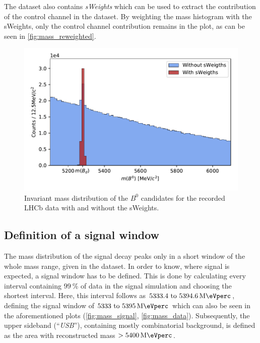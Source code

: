 The dataset also contains \textit{sWeights} which can be used to extract the contribution of the control channel in the dataset.
By weighting the mass histogram with the sWeights, only the control channel contribution remains in the plot, as can be seen in \autoref{fig:mass_reweighted}.
\begin{figure}
  \centering
  \includegraphics[width = .8\textwidth]{"content/plots/mass_reweighted.pdf"}
  \caption{Invariant mass distribution of the $B^0$ candidates for the recorded LHCb data with and without the sWeights.}
  \label{fig:mass_reweighted}
\end{figure}

\subsection{Definition of a signal window}
The mass distribution of the signal decay peaks only in a short window of the whole mass range, given in the dataset. In order to know, where signal is expected, a signal window 
has to be defined. This is done by calculating every interval containing $\qty{99}{\percent}$ of data in the signal simulation and choosing the shortest interval. 
Here, this interval follows as $\qtyrange[range-units = single]{5333.4}{5394.6}{\mega\eVperc}$, defining the signal window of 
$\qtyrange[range-units = single]{5333}{5395}{\mega\eVperc}$ which can also be seen in the aforementioned plots (\ref{fig:mass_signal}, \ref{fig:mass_data}).
Subsequently, the upper sideband (\enquote{\textit{USB}}), containing mostly combinatorial background, is defined as the area with reconstructed mass $> \qty{5400}{\mega\eVperc}$.

